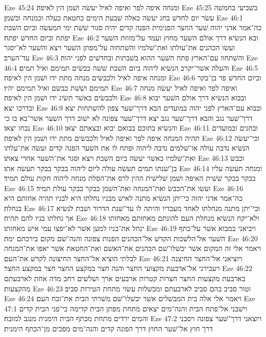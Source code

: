 Eze 45:24  ומנחה איפה לפר ואיפה לאיל יעשׂה ושׁמן הין לאיפה׃
Eze 45:25  בשׁביעי בחמשׁה עשׂר יום לחדשׁ בחג יעשׂה כאלה שׁבעת הימים כחטאת כעלה וכמנחה וכשׁמן׃
Eze 46:1  כה־אמר אדני יהוה שׁער החצר הפנימית הפנה קדים יהיה סגור שׁשׁת ימי המעשׂה וביום השׁבת יפתח וביום החדשׁ יפתח׃
Eze 46:2  ובא הנשׂיא דרך אולם השׁער מחוץ ועמד על־מזוזת השׁער ועשׂו הכהנים את־עולתו ואת־שׁלמיו והשׁתחוה על־מפתן השׁער ויצא והשׁער לא־יסגר עד־הערב׃
Eze 46:3  והשׁתחוו עם־הארץ פתח השׁער ההוא בשׁבתות ובחדשׁים לפני יהוה׃
Eze 46:4  והעלה אשׁר־יקרב הנשׂיא ליהוה ביום השׁבת שׁשׁה כבשׂים תמימם ואיל תמים׃
Eze 46:5  ומנחה איפה לאיל ולכבשׂים מנחה מתת ידו ושׁמן הין לאיפה׃
Eze 46:6  וביום החדשׁ פר בן־בקר תמימם ושׁשׁת כבשׂם ואיל תמימם יהיו׃
Eze 46:7  ואיפה לפר ואיפה לאיל יעשׂה מנחה ולכבשׂים כאשׁר תשׂיג ידו ושׁמן הין לאיפה׃
Eze 46:8  ובבוא הנשׂיא דרך אולם השׁער יבוא ובדרכו יצא׃
Eze 46:9  ובבוא עם־הארץ לפני יהוה במועדים הבא דרך־שׁער צפון להשׁתחות יצא דרך־שׁער נגב והבא דרך־שׁער נגב יצא דרך־שׁער צפונה לא ישׁוב דרך השׁער אשׁר־בא בו כי נכחו יצאו׃
Eze 46:10  והנשׂיא בתוכם בבואם יבוא ובצאתם יצאו׃
Eze 46:11  ובחגים ובמועדים תהיה המנחה איפה לפר ואיפה לאיל ולכבשׂים מתת ידו ושׁמן הין לאיפה׃
Eze 46:12  וכי־יעשׂה הנשׂיא נדבה עולה או־שׁלמים נדבה ליהוה ופתח לו את השׁער הפנה קדים ועשׂה את־עלתו ואת־שׁלמיו כאשׁר יעשׂה ביום השׁבת ויצא וסגר את־השׁער אחרי צאתו׃
Eze 46:13  וכבשׂ בן־שׁנתו תמים תעשׂה עולה ליום ליהוה בבקר בבקר תעשׂה אתו׃
Eze 46:14  ומנחה תעשׂה עליו בבקר בבקר שׁשׁית האיפה ושׁמן שׁלישׁית ההין לרס את־הסלת מנחה ליהוה חקות עולם תמיד׃
Eze 46:15  ועשׂו את־הכבשׂ ואת־המנחה ואת־השׁמן בבקר בבקר עולת תמיד׃
Eze 46:16  כה־אמר אדני יהוה כי־יתן הנשׂיא מתנה לאישׁ מבניו נחלתו היא לבניו תהיה אחזתם היא בנחלה׃
Eze 46:17  וכי־יתן מתנה מנחלתו לאחד מעבדיו והיתה לו עד־שׁנת הדרור ושׁבת לנשׂיא אך נחלתו בניו להם תהיה׃
Eze 46:18  ולא־יקח הנשׂיא מנחלת העם להונתם מאחזתם מאחזתו ינחל את־בניו למען אשׁר לא־יפצו עמי אישׁ מאחזתו׃
Eze 46:19  ויביאני במבוא אשׁר על־כתף השׁער אל־הלשׁכות הקדשׁ אל־הכהנים הפנות צפונה והנה־שׁם מקום בירכתם ימה׃
Eze 46:20  ויאמר אלי זה המקום אשׁר יבשׁלו־שׁם הכהנים את־האשׁם ואת־החטאת אשׁר יאפו את־המנחה לבלתי הוציא אל־החצר החיצונה לקדשׁ את־העם׃
Eze 46:21  ויוציאני אל־החצר החיצנה ויעבירני אל־ארבעת מקצועי החצר והנה חצר במקצע החצר חצר במקצע החצר׃
Eze 46:22  בארבעת מקצעות החצר חצרות קטרות ארבעים ארך ושׁלשׁים רחב מדה אחת לארבעתם מהקצעות׃
Eze 46:23  וטור סביב בהם סביב לארבעתם ומבשׁלות עשׂוי מתחת הטירות סביב׃
Eze 46:24  ויאמר אלי אלה בית המבשׁלים אשׁר יבשׁלו־שׁם משׁרתי הבית את־זבח העם׃
Eze 47:1  וישׁבני אל־פתח הבית והנה־מים יצאים מתחת מפתן הבית קדימה כי־פני הבית קדים והמים ירדים מתחת מכתף הבית הימנית מנגב למזבח׃
Eze 47:2  ויוצאני דרך־שׁער צפונה ויסבני דרך חוץ אל־שׁער החוץ דרך הפונה קדים והנה־מים מפכים מן־הכתף הימנית׃
